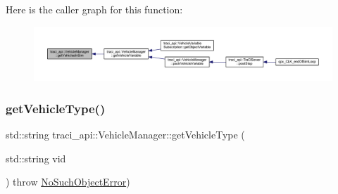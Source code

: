 Here is the caller graph for this function\+:\nopagebreak
\begin{figure}[H]
\begin{center}
\leavevmode
\includegraphics[width=350pt]{classtraci__api_1_1_vehicle_manager_ae70d2421d4a96ab7601dabb6fcc512b2_icgraph}
\end{center}
\end{figure}
\mbox{\label{classtraci__api_1_1_vehicle_manager_a946553555fa7a2a9f95b4baced6f0dbe}} 
\subsubsection{\texorpdfstring{get\+Vehicle\+Type()}{getVehicleType()}}
{\footnotesize\ttfamily std\+::string traci\+\_\+api\+::\+Vehicle\+Manager\+::get\+Vehicle\+Type (\begin{DoxyParamCaption}\item[{std\+::string}]{vid }\end{DoxyParamCaption}) throw  \hyperlink{classtraci__api_1_1_no_such_object_error}{No\+Such\+Object\+Error}) }

